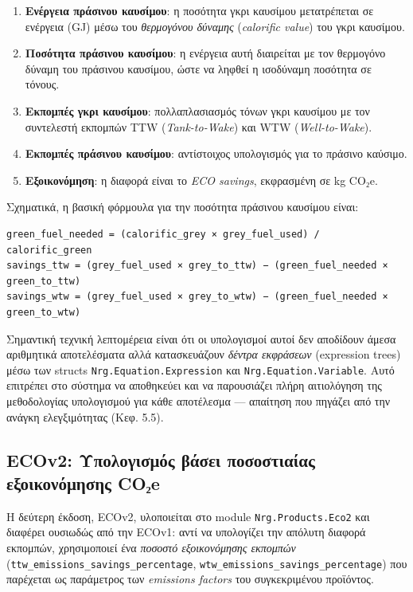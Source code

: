 \begin{enumerate}
\def\labelenumi{\arabic{enumi}.}
\tightlist
\item
  \textbf{Ενέργεια πράσινου καυσίμου}: η ποσότητα γκρι καυσίμου
  μετατρέπεται σε ενέργεια (GJ) μέσω του \emph{θερμογόνου δύναμης}
  (\emph{calorific value}) του γκρι καυσίμου.
\item
  \textbf{Ποσότητα πράσινου καυσίμου}: η ενέργεια αυτή διαιρείται με τον
  θερμογόνο δύναμη του πράσινου καυσίμου, ώστε να ληφθεί η ισοδύναμη
  ποσότητα σε τόνους.
\item
  \textbf{Εκπομπές γκρι καυσίμου}: πολλαπλασιασμός τόνων γκρι καυσίμου
  με τον συντελεστή εκπομπών TTW (\emph{Tank-to-Wake}) και WTW
  (\emph{Well-to-Wake}).
\item
  \textbf{Εκπομπές πράσινου καυσίμου}: αντίστοιχος υπολογισμός για το
  πράσινο καύσιμο.
\item
  \textbf{Εξοικονόμηση}: η διαφορά είναι το \emph{ECO savings},
  εκφρασμένη σε kg CO₂e.
\end{enumerate}

Σχηματικά, η βασική φόρμουλα για την ποσότητα πράσινου καυσίμου είναι:

\begin{verbatim}
green_fuel_needed = (calorific_grey × grey_fuel_used) / calorific_green
savings_ttw = (grey_fuel_used × grey_to_ttw) − (green_fuel_needed × green_to_ttw)
savings_wtw = (grey_fuel_used × grey_to_wtw) − (green_fuel_needed × green_to_wtw)
\end{verbatim}

Σημαντική τεχνική λεπτομέρεια είναι ότι οι υπολογισμοί αυτοί δεν
αποδίδουν άμεσα αριθμητικά αποτελέσματα αλλά κατασκευάζουν \emph{δέντρα
εκφράσεων} (expression trees) μέσω των structs
\texttt{Nrg.Equation.Expression} και \texttt{Nrg.Equation.Variable}.
Αυτό επιτρέπει στο σύστημα να αποθηκεύει και να παρουσιάζει πλήρη
αιτιολόγηση της μεθοδολογίας υπολογισμού για κάθε αποτέλεσμα ---
απαίτηση που πηγάζει από την ανάγκη ελεγξιμότητας (Κεφ. 5.5).

\subsection{ECOv2: Υπολογισμός βάσει ποσοστιαίας εξοικονόμησης
CO₂e}\label{ecov2-ux3c5ux3c0ux3bfux3bbux3bfux3b3ux3b9ux3c3ux3bcux3ccux3c2-ux3b2ux3acux3c3ux3b5ux3b9-ux3c0ux3bfux3c3ux3bfux3c3ux3c4ux3b9ux3b1ux3afux3b1ux3c2-ux3b5ux3beux3bfux3b9ux3baux3bfux3bdux3ccux3bcux3b7ux3c3ux3b7ux3c2-coux2082e}

Η δεύτερη έκδοση, ECOv2, υλοποιείται στο module
\texttt{Nrg.Products.Eco2} και διαφέρει ουσιωδώς από την ECOv1: αντί να
υπολογίζει την απόλυτη διαφορά εκπομπών, χρησιμοποιεί ένα \emph{ποσοστό
εξοικονόμησης εκπομπών} (\texttt{ttw\_emissions\_savings\_percentage},
\texttt{wtw\_emissions\_savings\_percentage}) που παρέχεται ως
παράμετρος των \emph{emissions factors} του συγκεκριμένου προϊόντος.

